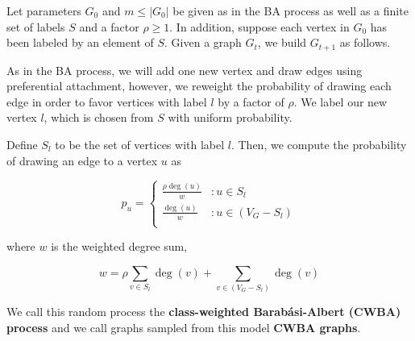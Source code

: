 \begin{definition}
  Let parameters $G_0$ and $m \leq |G_0|$ be given as in the BA process as well
  as a finite set of labels $S$ and a factor $\rho \ge 1$. In addition, suppose
  each vertex in $G_0$ has been labeled by an element of $S$. Given a graph
  $G_t$, we build $G_{t+1}$ as follows.

  As in the BA process, we will add one new vertex and draw edges using
  preferential attachment, however, we reweight the probability of drawing each
  edge in order to favor vertices with label $l$ by a factor of $\rho$. We label
  our new vertex $l$, which is chosen from $S$ with uniform probability.

  Define $S_l$ to be the set of vertices with label $l$. Then, we compute the
  probability of drawing an edge to a vertex $u$ as

  \[
    p_u = \begin{cases}
      \frac{\rho\deg(u)}{w} &: u \in S_l\\
      
      \frac{\deg(u)}{w} &: u \in (V_G - S_l)\\
    \end{cases}
  \]

  where $w$ is the weighted degree sum,

  \[
    w = \rho \sum_{v \in S_l}\deg(v) + \sum_{v \in (V_G - S_l)}\deg(v)
  \]

  We call this random process the \textbf{class-weighted Barab\'asi-Albert
    (CWBA) process} and we call graphs sampled from this model \textbf{CWBA
    graphs}.
\end{definition}


